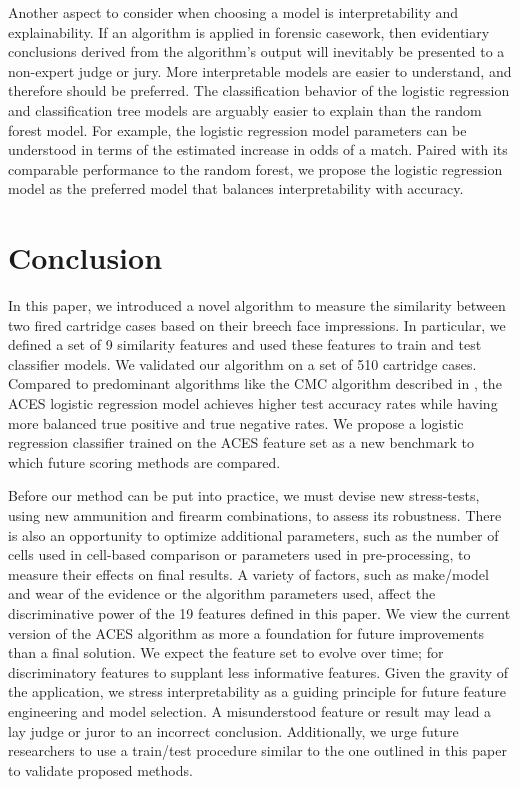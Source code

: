 \documentclass[reprint]{JASA}
\begin{document}
Another aspect to consider when choosing a model is interpretability and
explainability. If an algorithm is applied in forensic casework, then
evidentiary conclusions derived from the algorithm's output will
inevitably be presented to a non-expert judge or jury. More
interpretable models are easier to understand, and therefore should be
preferred. The classification behavior of the logistic regression and
classification tree models are arguably easier to explain than the
random forest model. For example, the logistic regression model
parameters can be understood in terms of the estimated increase in odds
of a match. Paired with its comparable performance to the random forest,
we propose the logistic regression model as the preferred model that
balances interpretability with accuracy.

\hypertarget{conclusion}{%
\section{Conclusion}\label{conclusion}}

In this paper, we introduced a novel algorithm to measure the similarity
between two fired cartridge cases based on their breech face
impressions. In particular, we defined a set of 9 similarity features
and used these features to train and test classifier models. We
validated our algorithm on a set of 510 cartridge cases. Compared to
predominant algorithms like the CMC algorithm described in
\citet{song_proposed_2013}, the ACES logistic regression model achieves
higher test accuracy rates while having more balanced true positive and
true negative rates. We propose a logistic regression classifier trained
on the ACES feature set as a new benchmark to which future scoring
methods are compared.

Before our method can be put into practice, we must devise new
stress-tests, using new ammunition and firearm combinations, to assess
its robustness. There is also an opportunity to optimize additional
parameters, such as the number of cells used in cell-based comparison or
parameters used in pre-processing, to measure their effects on final
results. A variety of factors, such as make/model and wear of the
evidence or the algorithm parameters used, affect the discriminative
power of the 19 features defined in this paper. We view the current
version of the ACES algorithm as more a foundation for future
improvements than a final solution. We expect the feature set to evolve
over time; for discriminatory features to supplant less informative
features. Given the gravity of the application, we stress
interpretability as a guiding principle for future feature engineering
and model selection. A misunderstood feature or result may lead a lay
judge or juror to an incorrect conclusion. Additionally, we urge future
researchers to use a train/test procedure similar to the one outlined in
this paper to validate proposed methods.
\end{document}
